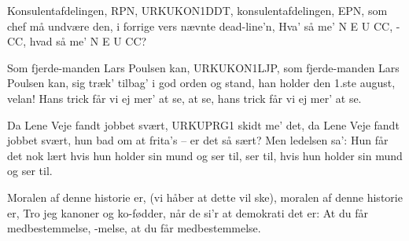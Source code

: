 \documentclass[a4paper,11pt]{article}
\begin{document}
\begin{song}
  Konsulentafdelingen, RPN,
  URKUKON1DDT,
  konsulentafdelingen, EPN,
  som chef må undvære den,
  i forrige vers nævnte dead-line'n,
  Hva' så me' N E U CC, -CC,
  hvad så me' N E U CC?

  Som fjerde-manden Lars Poulsen kan,
  URKUKON1LJP,
  som fjerde-manden Lars Poulsen kan,
  sig træk' tilbag' i god orden og stand,
  han holder den 1.ste august, velan!
  Hans trick får vi ej mer' at se, at se,
  hans trick får vi ej mer' at se.

  Da Lene Veje fandt jobbet svært,
  URKUPRG1 skidt me' det,
  da Lene Veje fandt jobbet svært,
  hun bad om at frita's -- er det så sært?
  Men ledelsen sa': Hun får det nok lært
  hvis hun holder sin mund og ser til, ser til,
  hvis hun holder sin mund og ser til.

  Moralen af denne historie er,
  (vi håber at dette vil ske),
  moralen af denne historie er,
  Tro jeg kanoner og ko-fødder,
  når de si'r at demokrati det er:
  At du får medbestemmelse, -melse,
  at du får medbestemmelse.
\end{song}
\end{document}
